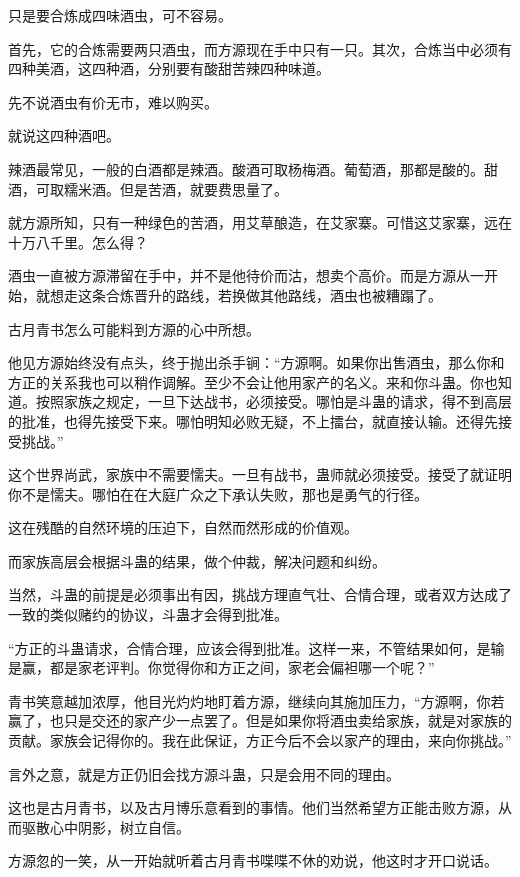 \begin{this_body}
只是要合炼成四味酒虫，可不容易。

首先，它的合炼需要两只酒虫，而方源现在手中只有一只。其次，合炼当中必须有四种美酒，这四种酒，分别要有酸甜苦辣四种味道。

先不说酒虫有价无市，难以购买。

就说这四种酒吧。

辣酒最常见，一般的白酒都是辣酒。酸酒可取杨梅酒。葡萄酒，那都是酸的。甜酒，可取糯米酒。但是苦酒，就要费思量了。

就方源所知，只有一种绿色的苦酒，用艾草酿造，在艾家寨。可惜这艾家寨，远在十万八千里。怎么得？

酒虫一直被方源滞留在手中，并不是他待价而沽，想卖个高价。而是方源从一开始，就想走这条合炼晋升的路线，若换做其他路线，酒虫也被糟蹋了。

古月青书怎么可能料到方源的心中所想。

他见方源始终没有点头，终于抛出杀手锏：“方源啊。如果你出售酒虫，那么你和方正的关系我也可以稍作调解。至少不会让他用家产的名义。来和你斗蛊。你也知道。按照家族之规定，一旦下达战书，必须接受。哪怕是斗蛊的请求，得不到高层的批准，也得先接受下来。哪怕明知必败无疑，不上擂台，就直接认输。还得先接受挑战。”

这个世界尚武，家族中不需要懦夫。一旦有战书，蛊师就必须接受。接受了就证明你不是懦夫。哪怕在在大庭广众之下承认失败，那也是勇气的行径。

这在残酷的自然环境的压迫下，自然而然形成的价值观。

而家族高层会根据斗蛊的结果，做个仲裁，解决问题和纠纷。

当然，斗蛊的前提是必须事出有因，挑战方理直气壮、合情合理，或者双方达成了一致的类似赌约的协议，斗蛊才会得到批准。

“方正的斗蛊请求，合情合理，应该会得到批准。这样一来，不管结果如何，是输是赢，都是家老评判。你觉得你和方正之间，家老会偏袒哪一个呢？”

青书笑意越加浓厚，他目光灼灼地盯着方源，继续向其施加压力，“方源啊，你若赢了，也只是交还的家产少一点罢了。但是如果你将酒虫卖给家族，就是对家族的贡献。家族会记得你的。我在此保证，方正今后不会以家产的理由，来向你挑战。”

言外之意，就是方正仍旧会找方源斗蛊，只是会用不同的理由。

这也是古月青书，以及古月博乐意看到的事情。他们当然希望方正能击败方源，从而驱散心中阴影，树立自信。

方源忽的一笑，从一开始就听着古月青书喋喋不休的劝说，他这时才开口说话。


\end{this_body}
